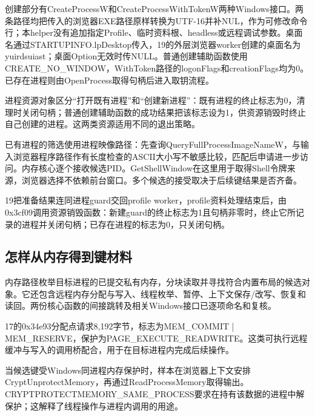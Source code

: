 \documentclass[UTF8,a4paper,zihao=5,fontset=windows]{ctexart}
\newcommand{\code}[1]{{\ttfamily\small #1}}
\begin{document}
创建部分有\code{CreateProcessW}和\code{CreateProcessWithTokenW}两种Windows接口。两条路径均把传入的浏览器EXE路径原样转换为UTF-16并补NUL，作为可修改命令行；本helper没有追加指定Profile、临时资料根、headless或远程调试参数。桌面名通过\code{STARTUPINFO.lpDesktop}传入，19的外层浏览器worker创建的桌面名为\code{yuirdsuiast}；桌面Option无效时传NULL。普通创建辅助函数使用\code{CREATE\_NO\_WINDOW}，WithToken路径的logonFlags和creationFlags均为0。已存在进程则由\code{OpenProcess}取得句柄后进入取钥流程。

进程资源对象区分“打开既有进程”和“创建新进程”：既有进程的终止标志为0，清理时关闭句柄；普通创建辅助函数的成功结果把该标志设为1，供资源销毁时终止自己创建的进程。这两类资源适用不同的退出策略。

已有进程的筛选使用进程映像路径：先查询\code{QueryFullProcessImageNameW}，与输入浏览器程序路径作有长度检查的ASCII大小写不敏感比较，匹配后申请进一步访问。内存核心逐个接收候选PID。\code{GetShellWindow}在这里用于取得Shell令牌来源，浏览器选择不依赖前台窗口。多个候选的接受取决于后续键结果是否齐备。

19把准备结果连同进程guard交回profile worker，profile资料处理结束后，由\code{0x3cf09}调用资源销毁函数：新建guard的终止标志为1且句柄非零时，终止它所记录的进程并关闭句柄；已存在进程的标志为0，只关闭句柄。

\subsection{怎样从内存得到键材料}
内存路径枚举目标进程的已提交私有内存，分块读取并寻找符合内置布局的候选对象。它还包含远程内存分配与写入、线程枚举、暂停、上下文保存/改写、恢复和读回。两份核心函数的间接跳转及相关Windows接口已逐项命名和复核。

17的\code{0x34e93}分配点请求8,192字节，标志为\code{MEM\_\allowbreak{}COMMIT | MEM\_\allowbreak{}RESERVE}，保护为\code{PAGE\_\allowbreak{}EXECUTE\_\allowbreak{}READWRITE}。这类可执行远程缓冲与写入的调用桥配合，用于在目标进程内完成后续操作。

当候选键受Windows同进程内存保护时，样本在浏览器上下文安排\code{CryptUnprotectMemory}，再通过\code{ReadProcessMemory}取得输出。\code{CRYPTPROTECTMEMORY\_SAME\_PROCESS}要求在持有该数据的进程中解保护；这解释了线程操作与进程内调用的用途。\cite{unprotectmemory}
\end{document}
